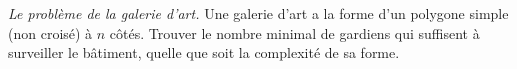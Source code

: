\emph{Le problème de la galerie d'art.} Une galerie d'art a la forme d'un polygone simple (non croisé) à $n$ côtés. Trouver le nombre minimal de gardiens qui suffisent à surveiller le bâtiment, quelle que soit la complexité de sa forme.
